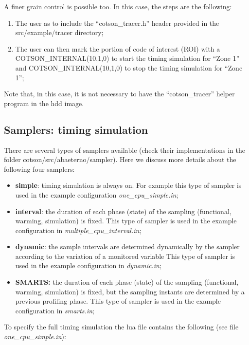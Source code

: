 \documentclass[a4paper]{article}
\begin{document}
{
A finer grain control is possible too. In this case, the steps are the
following:}

\begin{enumerate}
\item {
The user as to include the
{\textquotedblleft}cotson\_tracer.h{\textquotedblright} header provided
in the src/example/tracer directory;}
\item {
The user can then mark the portion of code of interest (ROI) with a
COTSON\_INTERNAL(10,1,0) to start the timing simulation for
{\textquotedblleft}Zone 1{\textquotedblright} and
COTSON\_INTERNAL(10,1,0) to stop the timing simulation for
{\textquotedblleft}Zone 1{\textquotedblright};}
\end{enumerate}
{
Note that, in this case, it is not necessary to have the
{\textquotedblleft}cotson\_tracer{\textquotedblright} helper program in
the hdd image.}

\subsection[Samplers: timing simulation]{Samplers: timing simulation}
\label{bkm:Ref388194089}\label{bkm:Ref388175073}\label{bkm:Ref388175045}{
There are several types of samplers available (check their
implementations in the folder cotson/src/abaeterno/sampler). Here we
discuss more details about the following four samplers:}

\begin{itemize}
\item {
\textbf{simple}: timing simulation is always on. For example this type
of sampler is used in the example configuration
\textit{one\_cpu\_simple.in};}
\item {
\textbf{interval}: the duration of each phase (state) of the sampling
(functional, warming, simulation) is fixed. This type of sampler is
used in the example configuration in
\textit{multiple\_cpu\_interval.in};}
\item {
\textbf{dynamic}: the sample intervals are determined dynamically by the
sampler according to the variation of a monitored variable This type of
sampler is used in the example configuration in \textit{dynamic.in};}
\item {
\textbf{SMARTS:} the duration of each phase (state) of the sampling
(functional, warming, simulation) is fixed, but the sampling instants
are determined by a previous profiling phase. This type of sampler is
used in the example configuration in \textit{smarts.in};}
\end{itemize}
{
To specify the full timing simulation the lua file contains the
following (see file \textit{one\_cpu\_simple.in}):}
\end{document}
